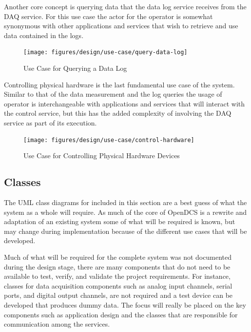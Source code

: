     Another core concept is querying data that the data log service receives
    from the DAQ service. For this use case the actor for the operator is
    somewhat synonymous with other applications and services that wish to
    retrieve and use data contained in the logs.

    \begin{figure}[H]
      \texttt{[image: figures/design/use-case/query-data-log]}
      \caption{Use Case for Querying a Data Log}
      \label{fig:dsg-use-query}
    \end{figure}

    Controlling physical hardware is the last fundamental use case of the
    system. Similar to that of the data measurement and the log queries the
    usage of operator is interchangeable with applications and services that
    will interact with the control service, but this has the added complexity
    of involving the DAQ service as part of its execution.

    \begin{figure}[H]
      \texttt{[image: figures/design/use-case/control-hardware]}
      \caption{Use Case for Controlling Physical Hardware Devices}
      \label{fig:dsg-use-control-hw}
    \end{figure}

  \subsection{Classes}\label{sec:dsg-classes}

    The UML class diagrams for included in this section are a best guess of
    what the system as a whole will require. As much of the core of OpenDCS
    is a rewrite and adaptation of an existing system some of what will be
    required is known, but may change during implementation because of the
    different use cases that will be developed.

    Much of what will be required for the complete system was not documented
    during the design stage, there are many components that do not need to be
    available to test, verify, and validate the project requirements. For
    instance, classes for data acquisition components such as analog input
    channels, serial ports, and digital output channels, are not required and
    a test device can be developed that produces dummy data. The focus will
    really be placed on the key components such as application design and the
    classes that are responsible for communication among the services.

